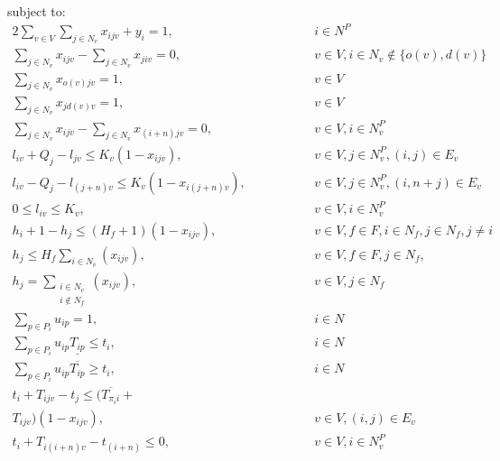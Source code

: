 \documentclass[a4paper,10pt]{article}
\begin{document}
subject to:
\begingroup
    \allowdisplaybreaks
\begin{alignat} {2}
    \sum_{v\in V}\sum_{j\in N_v}x_{ijv} + y_i = 1,	        	&\quad\quad\quad&& 	 i \in N^P 				\label{eq:2} 	\\[4pt]
    \sum_{j\in N_v}x_{ijv} - \sum_{j\in N_v}x_{jiv} = 0,		& 	&&	v \in V, i\in N_v \notin \{o(v), d(v)\}		\label{eq:3} 	\\[4pt]
    \sum_{j\in N_v}x_{o(v)jv} = 1,				        & 	&&	v \in V 					\label{eq:4}	\\[4pt]
    \sum_{j\in N_v}x_{j d(v)v} = 1,					& 	&&	v \in V 					\label{eq:5}	\\[4pt]
    \sum_{j\in N_v}x_{ijv} - \sum_{j\in N_v}x_{(i+n)jv} = 0,  	        & 	&&	v \in V, i\in N^P_v 				\label{eq:6}	\\[4pt]
    l_{iv} + Q_j - l_{jv} \leq K_v(1-x_{ijv}),			        & 	&&	v \in V, j\in N_v^P, (i,j) \in E_v 		\label{eq:7} 	\\[8pt]
    l_{iv} - Q_j - l_{(j+n)v} \leq K_v(1-x_{i(j+n)v}),	        	& 	&&	v \in V ,j\in N_v^P, (i, n+j)\in E_v 		\label{eq:8}	\\[8pt]
    0 \leq l_{iv} \leq K_v,						& 	&&	v \in V, i \in N^P_v 				\label{eq:9}	\\[8pt]
    h_{i} + 1 - h_{j} \leq (H_f+1)(1-x_{ijv}),				& 	&&	v \in V, f\in F,  i \in N_f, j \in N_f, j\neq i	\label{eq:10}	\\[4pt]
    h_{j} \leq H_f\sum_{i\in N_v}(x_{ijv}),				& 	&&	v \in V,f\in F, j\in N_f,  			\label{eq:11}	\\[4pt]
    h_{j} = \sum_{\substack{i\in N_v\\i{\notin} N_f}}(x_{ijv}),	        & 	&&	v \in V, j \in N_f                      	\label{eq:12}	\\[4pt]
    \sum_{p\in P_i} u_{ip} = 1,						& 	&& 	i \in N 					\label{eq:13}	\\[4pt]
    \sum_{p\in P_i} u_{ip}\underline{T_{ip}} \leq t_{i},		& 	&&	i \in N 					\label{eq:14}	\\[4pt]
    \sum_{p\in P_i} u_{ip}\overline{T_{ip}} \geq t_{i},			& 	&& 	i \in N 					\label{eq:15}	\\[4pt]
    t_{i} + T_{ijv} - t_{j} \leq (\overline{T_{\pi_i i}} + 		& 	&&						\nonumber\\
    T_{ijv})(1 - x_{ijv}),						& 	&& 	v \in V, (i,j) \in E_v				\label{eq:16}	\\[8pt]
    t_{i} + T_{i(i+n)v} - t_{(i+n)} \leq 0,				& 	&& 	v \in V, i \in N_v^P				\label{eq:17}	\\[8pt]

\end{alignat}
\end{document}
